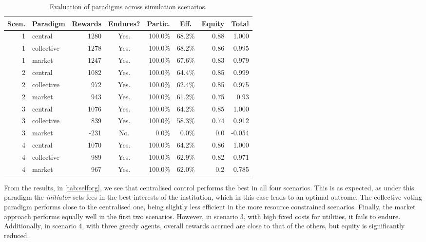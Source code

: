 \begin{table}
\centering
\caption[Evaluation of paradigms across simulation scenarios.]{Evaluation of paradigms across simulation scenarios.}\label{tab:selforg}
\begin{tabular}{rl|rcrrr|r}
\multicolumn{1}{c}{Scen.} & Paradigm & \multicolumn{1}{c}{Rewards} & \multicolumn{1}{c}{Endures?} & \multicolumn{1}{c}{Partic.} & \multicolumn{1}{c}{Eff.} & Equity & \multicolumn{1}{c}{Total} \\
\hline \hline
1 & central & 1280 & Yes. & 100.0\% & 68.2\% & 0.88 & 1.000 \\
1 & collective & 1278 & Yes. & 100.0\% & 68.2\% & 0.86 & 0.995 \\
1 & market & 1247 & Yes. & 100.0\% & 67.6\% & 0.83 & 0.979 \\
\hline
2 & central & 1082 & Yes. & 100.0\% & 64.4\% & 0.85 & 0.999 \\
2 & collective & 972 & Yes. & 100.0\% & 62.4\% & 0.85 & 0.975 \\
2 & market & 943 & Yes. & 100.0\% & 61.2\% & 0.75 & 0.93 \\
\hline
3 & central & 1076 & Yes. & 100.0\% & 64.2\% & 0.85 & 1.000 \\
3 & collective & 839 & Yes. & 100.0\% & 58.3\% & 0.74 & 0.912 \\
3 & market & -231 & No. & 0.0\% & 0.0\% & 0.0 & -0.054 \\
\hline
4 & central & 1070 & Yes. & 100.0\% & 64.2\% & 0.86 & 1.000 \\
4 & collective & 989 & Yes. & 100.0\% & 62.9\% & 0.82 & 0.971 \\
4 & market & 967 & Yes. & 100.0\% & 62.0\% & 0.2 & 0.785 \\
\end{tabular}
\end{table}

From the results, in \autoref{tab:selforg}, we see that centralised control
performs the best in all four scenarios. This is as expected, as under this
paradigm the \emph{initiator} sets fees in the best interests of the institution,
which in this case leads to an optimal outcome. The collective voting paradigm
performs close to the centralised one, being slightly less efficient in the more
resource constrained scenarios. Finally, the market approach performs equally
well in the first two scenarios. However, in scenario 3, with high fixed costs
for utilities, it fails to endure. Additionally, in scenario 4, with three
greedy agents, overall rewards accrued are close to that of the others,
but equity is significantly reduced.

